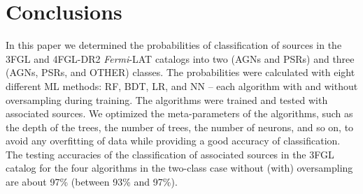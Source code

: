 \documentclass[referee]{aa} %
\newcommand{\lb}{\label}
\newcommand{\Fermi}{\textit{Fermi}\xspace}
\begin{document}
\begin{table}[!h]
\caption{Expected counts of sources among unassociated 4FGL-DR2 sources.}
\label{tab:expected_counts_prob_4FGL-DR2}

\centering
\end{table}


\section{Conclusions}
\lb{sec:conclusions}

In this paper we determined the probabilities of classification of sources in the 3FGL and 4FGL-DR2 \Fermi-LAT catalogs
into two (AGNs and PSRs) and three (AGNs, PSRs, and OTHER) classes.
The probabilities were calculated with eight different ML methods: RF, BDT, LR, and NN -- each algorithm with and without oversampling during training.
The algorithms were trained and tested with associated sources.
We optimized the meta-parameters of the algorithms, such as the depth of the trees, the number of trees, the number of neurons, and so on, to avoid any overfitting of data while providing a good accuracy of classification.
The testing accuracies of the classification of associated sources in the 3FGL catalog for the four algorithms in the two-class case without (with) oversampling are about  97\% (between 93\% and 97\%).
\end{document}
